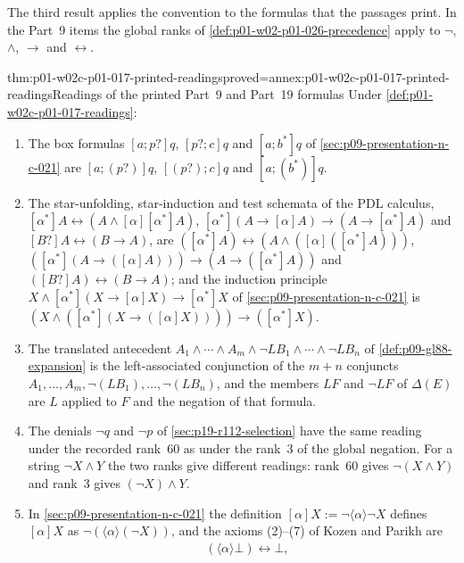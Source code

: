 The third result applies the convention to the formulas that the passages
print.  In the Part~9 items the global ranks of
\cref{def:p01-w02-p01-026-precedence} apply to \(\neg\), \(\land\),
\(\to\) and \(\leftrightarrow\).

\begin{hblemma}{thm:p01-w02c-p01-017-printed-readings}{proved=annex:p01-w02c-p01-017-printed-readings}{Readings of the printed Part~9 and Part~19 formulas}
Under \cref{def:p01-w02c-p01-017-readings}:
\begin{enumerate}
\item The box formulas \([a;p?]q\), \([p?;c]q\) and \([a;b^{*}]q\) of
  \cref{sec:p09-presentation-n-c-021} are \([a;(p?)]q\), \([(p?);c]q\) and
  \([a;(b^{*})]q\).
\item The star-unfolding, star-induction and test schemata of the PDL
  calculus,
  \([\alpha^{*}]A\leftrightarrow(A\land[\alpha][\alpha^{*}]A)\),
  \([\alpha^{*}](A\to[\alpha]A)\to(A\to[\alpha^{*}]A)\) and
  \([B?]A\leftrightarrow(B\to A)\), are
  \(([\alpha^{*}]A)\leftrightarrow(A\land([\alpha]([\alpha^{*}]A)))\),
  \(([\alpha^{*}](A\to([\alpha]A)))\to(A\to([\alpha^{*}]A))\) and
  \(([B?]A)\leftrightarrow(B\to A)\); and the induction principle
  \(X\land[\alpha^{*}](X\to[\alpha]X)\to[\alpha^{*}]X\) of
  \cref{sec:p09-presentation-n-c-021} is
  \((X\land([\alpha^{*}](X\to([\alpha]X))))\to([\alpha^{*}]X)\).
\item The translated antecedent
  \(A_1\land\cdots\land A_m\land\neg LB_1\land\cdots\land\neg LB_n\) of
  \cref{def:p09-gl88-expansion} is the left-associated conjunction of the
  \(m+n\) conjuncts \(A_1,\ldots,A_m,\neg(LB_1),\ldots,\neg(LB_n)\), and
  the members \(LF\) and \(\neg LF\) of \(\Delta(E)\) are \(L\) applied to
  \(F\) and the negation of that formula.
\item The denials \(\neg q\) and \(\neg p\) of
  \cref{sec:p19-r112-selection} have the same reading under the recorded
  rank~60 as under the rank~3 of the global negation.  For a string
  \(\neg X\land Y\) the two ranks give different readings: rank~60 gives
  \(\neg(X\land Y)\) and rank~3 gives \((\neg X)\land Y\).
\item In \cref{sec:p09-presentation-n-c-021} the definition
  \([\alpha]X:=\neg\langle\alpha\rangle\neg X\) defines \([\alpha]X\) as
  \(\neg(\langle\alpha\rangle(\neg X))\), and the axioms (2)--(7) of
  Kozen and Parikh are
  \begin{align*}
   &(\langle\alpha\rangle\bot)\leftrightarrow\bot,\\

\end{align*}
\end{enumerate}
\end{hblemma}
